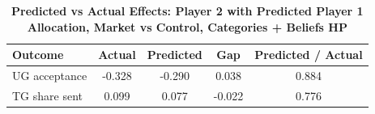 \begin{table}[!htbp]
\centering
\caption{\textbf{Predicted vs Actual Effects: Player 2 with Predicted Player 1 Allocation, Market vs Control, Categories + Beliefs HP}}
\label{tab:cats_hp_market_vs_control_predsender_fullpooled_p2_fit}
\begin{tabular}{lcccc}
\toprule
Outcome & Actual & Predicted & Gap & Predicted / Actual \\
\midrule
UG acceptance & -0.328 & -0.290 & 0.038 & 0.884 \\
TG share sent & 0.099 & 0.077 & -0.022 & 0.776 \\
\bottomrule
\end{tabular}
\end{table}
